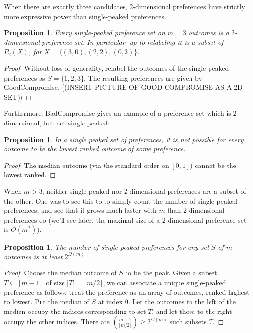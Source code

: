 \documentclass[12pt]{article}
\newtheorem{proposition}[theorem]{Proposition}
\newcommand{\1}[1]{\mathds{1}[{#1}]}
\begin{document}
  When there are exactly three candidates, $2$-dimensional
  preferences have strictly more expressive power than
  single-peaked preferences.
  \begin{proposition}
    Every single-peaked preference set on $m=3$ outcomes
    is a $2$-dimensional preference set. In particular,
    up to relabeling it is a subset of $P_2(X)$, for
    $X = \{ (3,0), (2,2), (0,3) \}$.
  \end{proposition}
  \begin{proof}
    Without loss of generality, relabel the outcomes
    of the single peaked preferences as $S = \{1,2,3\}$.
    The resulting preferences are given by {\sc GoodCompromise}.
    ((INSERT PICTURE OF GOOD COMPROMISE AS A 2D SET))
  \end{proof}
  Furthermore, {\sc BadCompromise} gives an example of a preference set
  which is $2$-dimensional, but not single-peaked:
  \begin{proposition}
    In a single peaked set of preferences, it is not possible
    for every outcome to be the lowest ranked outcome of some preference.
  \end{proposition}
  \begin{proof}
    The median outcome (via the standard order on $[0,1]$)
    cannot be the lowest ranked.
  \end{proof}

  When $m>3$, neither single-peaked nor $2$-dimensional preferences
  are a subset of the other. One was to see this to to simply
  count the number of single-peaked preferences, and see that it
  grows much faster with $m$ than $2$-dimensional preferences do
  (we'll see later, the maximal size of a $2$-dimensional
  preference set is $O(m^2)$).
  \begin{proposition}
    The number of single-peaked preferences for any set $S$ of $m$ outcomes
    is at least $2^{\Omega(m)}$
  \end{proposition}
  \begin{proof}
    Choose the median outcome of $S$ to be the peak.
    Given a subset $T\subseteq [m-1]$ of size $|T| = \lfloor m/2\rfloor$,
    we can associate a
    unique single-peaked preference as follows:
    treat the preference as an array of outcomes, ranked highest to lowest.
    Put the median of $S$ at index $0$.
    Let the outcomes to the left of the median occupy the indices corresponding
    to set $T$, and let those to the right occupy the other indices.
    There are ${m-1 \choose \lfloor m/2\rfloor } \ge 2^{\Omega(m)}$ such
    subsets $T$.
  \end{proof}
\end{document}
